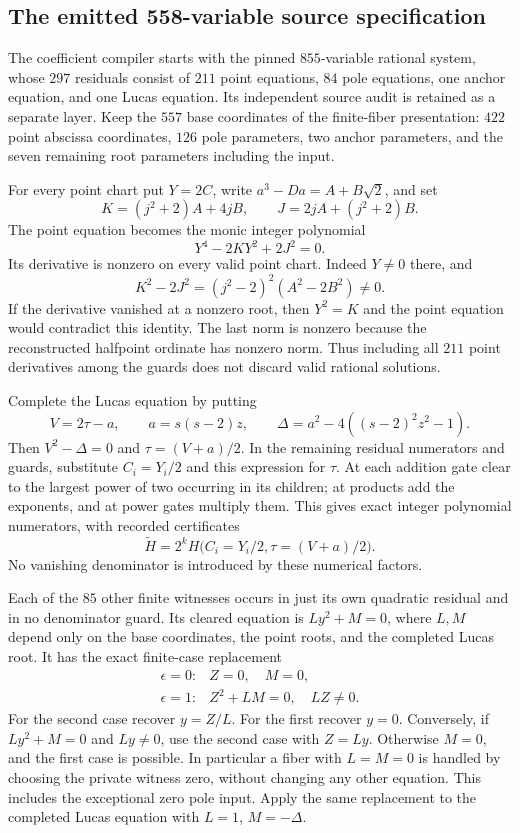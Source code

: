 \subsection{The emitted 558-variable source specification}
\label{subsec:emitted-558-source}

The coefficient compiler starts with the pinned $855$-variable rational
system, whose $297$ residuals consist of $211$ point equations, $84$
pole equations, one anchor equation, and one Lucas equation. Its
independent source audit is retained as a separate layer. Keep the
$557$ base coordinates of the finite-fiber presentation: $422$ point
abscissa coordinates, $126$ pole parameters, two anchor parameters,
and the seven remaining root parameters including the input.

For every point chart put $Y=2C$, write
$a^3-Da=A+B\sqrt2$, and set
\[
 K=(j^2+2)A+4jB,\qquad J=2jA+(j^2+2)B.
\]
The point equation becomes the monic integer polynomial
\[
 Y^4-2KY^2+2J^2=0.
\]
Its derivative is nonzero on every valid point chart. Indeed $Y\ne0$
there, and
\[
 K^2-2J^2=(j^2-2)^2(A^2-2B^2)\ne0.
\]
If the derivative vanished at a nonzero root, then $Y^2=K$ and
the point equation would contradict this identity. The last norm
is nonzero because the reconstructed halfpoint ordinate has
nonzero norm. Thus including all $211$ point derivatives among the
guards does not discard valid rational solutions.

Complete the Lucas equation by putting
\[
 V=2\tau-a,\qquad a=s(s-2)z,\qquad
 \Delta=a^2-4((s-2)^2z^2-1).
\]
Then $V^2-\Delta=0$ and $\tau=(V+a)/2$. In the remaining
residual numerators and guards, substitute $C_i=Y_i/2$ and this
expression for $\tau$. At each addition gate clear to the largest
power of two occurring in its children; at products add the
exponents, and at power gates multiply them. This gives exact
integer polynomial numerators, with recorded certificates
\[
 \widetilde H=2^k H\bigl(C_i=Y_i/2,\tau=(V+a)/2\bigr).
\]
No vanishing denominator is introduced by these numerical factors.

Each of the $85$ other finite witnesses occurs in just its own
quadratic residual and in no denominator guard. Its cleared equation
is $Ly^2+M=0$, where $L,M$ depend only on the base coordinates,
the point roots, and the completed Lucas root. It has the exact
finite-case replacement
\[
 \begin{array}{ll}
 \epsilon=0:& Z=0,\quad M=0,\\[2pt]
 \epsilon=1:& Z^2+LM=0,\quad LZ\ne0.
 \end{array}
\]
For the second case recover $y=Z/L$. For the first recover $y=0$.
Conversely, if $Ly^2+M=0$ and $Ly\ne0$, use the second case with
$Z=Ly$. Otherwise $M=0$, and the first case is possible. In
particular a fiber with $L=M=0$ is handled by choosing the private
witness zero, without changing any other equation. This includes
the exceptional zero pole input. Apply the same replacement to
the completed Lucas equation with $L=1$, $M=-\Delta$.

